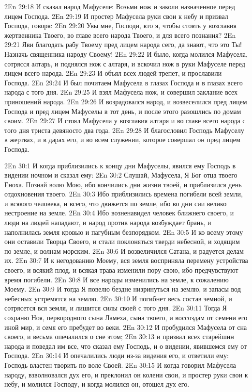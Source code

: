 \vs 2En 29:18
И сказал народ Мафуселе: Возьми нож и заколи назначенное перед лицем Господа.
\vs 2En 29:19
И простер Мафусела руки свои к небу и призвал Господа, говоря:
\vs 2En 29:20
Увы мне, Господи, кто я, чтобы стоять у возглавия жертвенника Твоего, во главе всего народа Твоего, и для всего познания?
\vs 2En 29:21
Яви благодать рабу Твоему пред лицем народа сего, да знают, что это Ты! Назначь священника народу Своему!
\vs 2En 29:22
И было, когда молился Мафусела, сотрясся алтарь, и поднялся нож с алтаря, и вскочил нож в руки Мафуселе перед лицем всего народа.
\vs 2En 29:23
И объял всех людей трепет, и прославили Господа.
\vs 2En 29:24
И был почитаем Мафусела в глазах Господа и в глазах всего народа с того дня.
\vs 2En 29:25
И взял Мафусела нож, и совершил заклание всех приношений народа.
\vs 2En 29:26
И возрадовался народ, и возвеселился пред лицем Господа и пред лицем Мафуселы в тот день, и после этого разошлись по домам своим.
\vs 2En 29:27
И стоял Мафусела у возглавия алтаря и во главе всего народа с того дня триста девяносто два года.
\vs 2En 29:28
И благословил Господь Мафуселу в жертвах, и в дарах его, и во всем служении, которое совершал он пред лицем Господа.

\vs 2En 30:1
И когда приблизились к концу дни Мафуселы, явился ему Господь в видении ночном и сказал ему:
\vs 2En 30:2
Слушай, Мафусела, Я Бог отца твоего Еноха. Познай волю Мою, ибо кончились дни жизни твоей, и приблизился день отдохновения твоего.
\vs 2En 30:3
Ибо приблизились времена погибели всей земли, и всякого человека, и всего, что движется по земле, ибо во дни сии велико нестроение на земле.
\vs 2En 30:4
Ибо возненавидел человек ближнего своего, и люди на людей нападают, и народ против народа возбуждает брань, и наполнилась земля кровью и пагубным безпорядком.
\vs 2En 30:5
И ко всему этому они оставили Творца Своего, и стали поклоняться тверди небесной, и ходящим по земле, и волнам морским.
\vs 2En 30:6
И возвеличился Сатана, и радуется делам их.
\vs 2En 30:7
И к негодованию Моему, вся земля восприняла перемену устройства своего, и всякий плод, и всякая трава изменили пору свою, ибо предчувствуют время погибели.
\vs 2En 30:8
И все народы изменились на земле, к сожалению Моему.
\vs 2En 30:9
И тогда Я повелю бездне низринуться на землю, и запасы вод небесных устремятся на землю.
\vs 2En 30:10
И погибнет весь состав земной, и сотрясется вся земля, и лишится силы своей с того дня.
\vs 2En 30:11
Тогда Я сохраню Ноя, первородного сына Ламеха, сына твоего, и воссоздам от семени его иной мир, и семя его пребудет во веки.
\vs 2En 30:12
И пробудился Мафусела от сна своего, и весьма опечалился о сне этом;
\vs 2En 30:13
и призвал всех старейшин народа и поведал им все, что сказал ему Господь, и о видении, явившемся ему от Господа.
\vs 2En 30:14
И опечалились люди из-за видения его, и ответили ему: Господь властен творить по воле Своей.
\vs 2En 30:15
И когда говорил Мафусела народу, взволновался дух его, и преклонил он колени свои, и простер руки свои к небу, и молился Господу, и когда молился он, отошел дух его.

